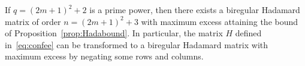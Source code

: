 \begin{theo}\label{thm:main1}
If $q=(2m+1)^2+2$ is a prime power, then there exists a biregular Hadamard matrix of order $n=(2m+1)^2+3$ with maximum excess attaining the bound of Proposition~\ref{prop:Hadabound}. In particular, the matrix $H$ defined in~\eqref{eq:confee} can be transformed to a biregular Hadamard matrix with maximum excess by negating some rows and columns.
\end{theo}
